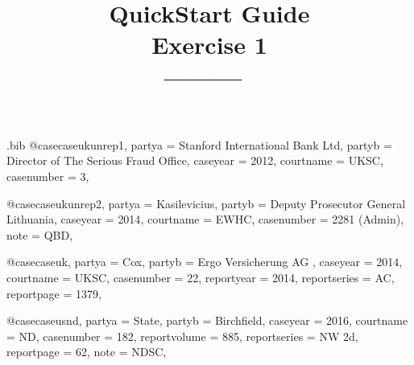 \begin{filecontents*}[overwrite]{\jobname.bib}
@case{caseukunrep1,
  partya = {Stanford International Bank Ltd}, 
  partyb = {Director of The Serious Fraud Office},
  caseyear = {2012},
  courtname = {UKSC},
  casenumber = {3},
	}

@case{caseukunrep2,
  partya = {Kasilevicius}, 
  partyb = {Deputy Prosecutor General Lithuania},
  caseyear = {2014},
  courtname = {EWHC},
  casenumber = {2281 (Admin)},
	note = {QBD},
	}



@case{caseuk,
  partya = {Cox}, 
  partyb = {Ergo Versicherung AG },
  caseyear = {2014},
  courtname = {UKSC},
  casenumber = {22},
  reportyear = {2014},
  reportseries = {AC},
  reportpage = {1379},
	}



@case{caseusnd,
  partya = {State}, 
  partyb = {Birchfield},
  caseyear = {2016},
  courtname = {ND},
  casenumber = {182},
  reportvolume = {885},
  reportseries = {NW 2d},
  reportpage = {62},
  note = {NDSC},
	}



\end{filecontents*}

\documentclass[12pt]{article}
\title{QuickStart Guide \\Exercise 1\\[24pt]\normalsize \hfill ---------\hfill\ }
\author{}
\date{}
\newcommand\rulesep{\rule{0.4\textwidth}{.4pt}}
\usepackage[table]{xcolor}
\usepackage{fontspec}
\setmainfont{Noto Serif}
\setsansfont{Noto Sans}[Scale=0.9]
\setmonofont{Noto Sans Mono}[Colour=blue]
\newfontface{}
\newcommand\goodoh{{\large\ftmark 🗸}}
\newcommand\notsogoodoh{{\large\ftmark 🗶}}

\usepackage{splitidx}

\newcommand\bef[1]{(\textit{#1})}
\newcommand\cef[1]{\textit{#1}}
\newcommand\cmd[1]{\textsf{\textbackslash\textbf{#1}}}
\newcommand\cmdb[2]{\textsf{\textbackslash\textbf{#1}\{#2\}}}

\usepackage[style=lawcite,
	print-toc-tos=true,
	use-toc-parnumrefs=false,
	ibidtracker=false,%
	]{biblatex}




